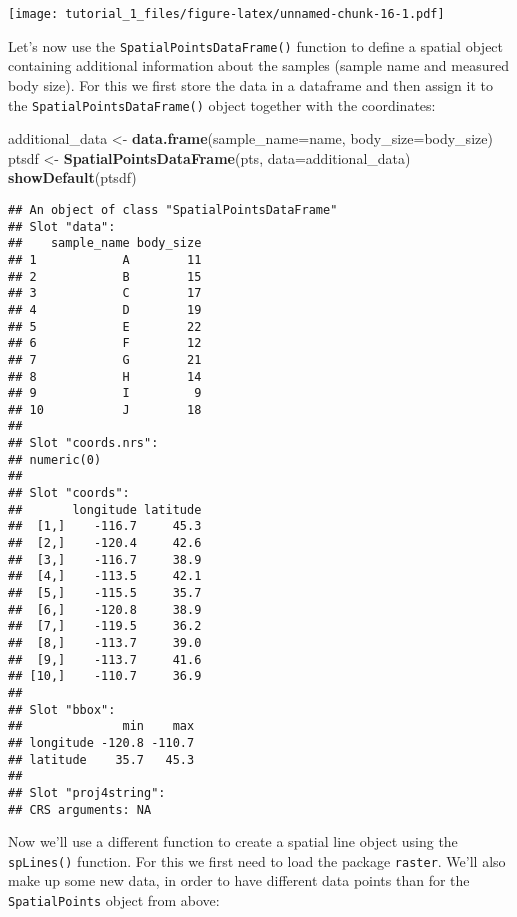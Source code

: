 \documentclass[]{article}
\newenvironment{Shaded}{\begin{snugshade}}{\end{snugshade}}
\newcommand{\DataTypeTok}[1]{\textcolor[rgb]{0.13,0.29,0.53}{#1}}
\newcommand{\KeywordTok}[1]{\textcolor[rgb]{0.13,0.29,0.53}{\textbf{#1}}}
\newcommand{\NormalTok}[1]{#1}
\newcommand{\StringTok}[1]{\textcolor[rgb]{0.31,0.60,0.02}{#1}}
\begin{document}
\texttt{[image: tutorial\_1\_files/figure-latex/unnamed-chunk-16-1.pdf]}

Let's now use the \texttt{SpatialPointsDataFrame()} function to define a
spatial object containing additional information about the samples
(sample name and measured body size). For this we first store the data
in a dataframe and then assign it to the
\texttt{SpatialPointsDataFrame()} object together with the coordinates:

\begin{Shaded}
\begin{Highlighting}[]
\NormalTok{additional_data <-}\StringTok{ }\KeywordTok{data.frame}\NormalTok{(}\DataTypeTok{sample_name=}\NormalTok{name, }\DataTypeTok{body_size=}\NormalTok{body_size)}
\NormalTok{ptsdf <-}\StringTok{ }\KeywordTok{SpatialPointsDataFrame}\NormalTok{(pts, }\DataTypeTok{data=}\NormalTok{additional_data)}
\KeywordTok{showDefault}\NormalTok{(ptsdf)}
\end{Highlighting}
\end{Shaded}

\begin{verbatim}
## An object of class "SpatialPointsDataFrame"
## Slot "data":
##    sample_name body_size
## 1            A        11
## 2            B        15
## 3            C        17
## 4            D        19
## 5            E        22
## 6            F        12
## 7            G        21
## 8            H        14
## 9            I         9
## 10           J        18
## 
## Slot "coords.nrs":
## numeric(0)
## 
## Slot "coords":
##       longitude latitude
##  [1,]    -116.7     45.3
##  [2,]    -120.4     42.6
##  [3,]    -116.7     38.9
##  [4,]    -113.5     42.1
##  [5,]    -115.5     35.7
##  [6,]    -120.8     38.9
##  [7,]    -119.5     36.2
##  [8,]    -113.7     39.0
##  [9,]    -113.7     41.6
## [10,]    -110.7     36.9
## 
## Slot "bbox":
##              min    max
## longitude -120.8 -110.7
## latitude    35.7   45.3
## 
## Slot "proj4string":
## CRS arguments: NA
\end{verbatim}

Now we'll use a different function to create a spatial line object using
the \texttt{spLines()} function. For this we first need to load the
package \texttt{raster}. We'll also make up some new data, in order to
have different data points than for the \texttt{SpatialPoints} object
from above:
\end{document}
